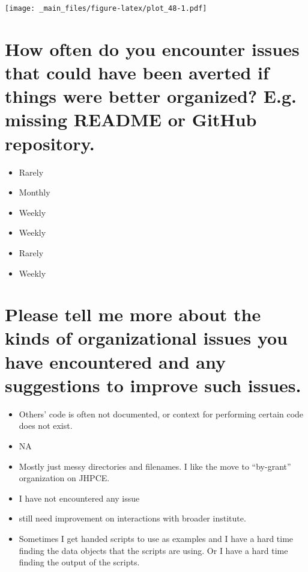 \documentclass[
]{book}
\providecommand{\tightlist}{%
  \setlength{\itemsep}{0pt}\setlength{\parskip}{0pt}}
\begin{document}
\texttt{[image: \_main\_files/figure-latex/plot\_48-1.pdf]}

\hypertarget{how-often-do-you-encounter-issues-that-could-have-been-averted-if-things-were-better-organized-e.g.-missing-readme-or-github-repository.}{%
\section{How often do you encounter issues that could have been averted if things were better organized? E.g. missing README or GitHub repository.}\label{how-often-do-you-encounter-issues-that-could-have-been-averted-if-things-were-better-organized-e.g.-missing-readme-or-github-repository.}}

\begin{itemize}
\tightlist
\item
  Rarely
\item
  Monthly
\item
  Weekly
\item
  Weekly
\item
  Rarely
\item
  Weekly
\end{itemize}

\hypertarget{please-tell-me-more-about-the-kinds-of-organizational-issues-you-have-encountered-and-any-suggestions-to-improve-such-issues.}{%
\section{Please tell me more about the kinds of organizational issues you have encountered and any suggestions to improve such issues.}\label{please-tell-me-more-about-the-kinds-of-organizational-issues-you-have-encountered-and-any-suggestions-to-improve-such-issues.}}

\begin{itemize}
\tightlist
\item
  Others' code is often not documented, or context for performing certain code does not exist.
\item
  NA
\item
  Mostly just messy directories and filenames. I like the move to ``by-grant'' organization on JHPCE.
\item
  I have not encountered any issue
\item
  still need improvement on interactions with broader institute.
\item
  Sometimes I get handed scripts to use as examples and I have a hard time finding the data objects that the scripts are using. Or I have a hard time finding the output of the scripts.
\end{itemize}
\end{document}
